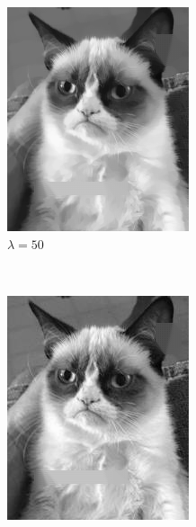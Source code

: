 \documentclass{paper}
\begin{document}
\begin{figure}[ht]
\begin{subfigure}[ht]{0.3\textwidth}
	\includegraphics[width=\textwidth]{result-cat-lambda50-theta0_5-iter1500}
	\caption*{$\lambda = 50$}
\end{subfigure}
~
\begin{subfigure}[ht]{0.3\textwidth}
	\centering
	\includegraphics[width=\textwidth]{result-cat-lambda1000-theta0_5-iter1500}

\end{subfigure}
\end{figure}
\end{document}
